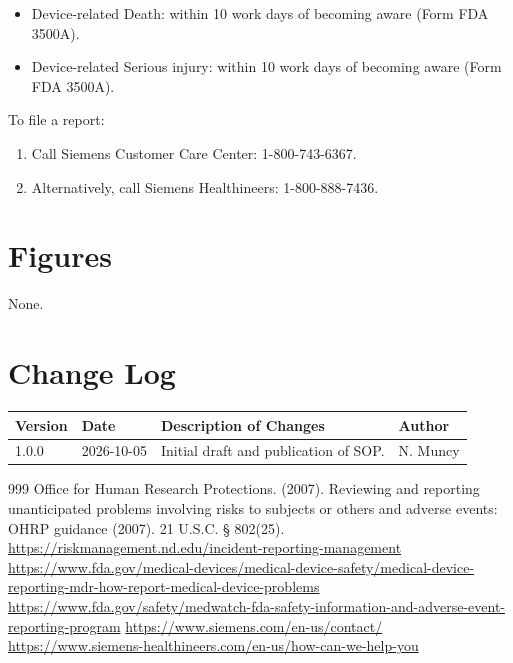 \documentclass[11pt]{article}
\begin{document}
\begin{itemize}
	\item Device-related Death: within 10 work days of becoming aware (Form FDA 3500A).
	\item Device-related Serious injury: within 10 work days of becoming aware (Form FDA 3500A).
\end{itemize}

To file a report:

\begin{enumerate}
	\item Call Siemens Customer Care Center: 1-800-743-6367\cite{siemens-care}.
	\item Alternatively, call Siemens Healthineers: 1-800-888-7436\cite{siemens-health}.
\end{enumerate}

\section{Figures}

None.


\pagebreak

\section{Change Log}
\noindent
\begin{tabularx}{\textwidth}{@{} l l X l @{}}
\toprule
\textbf{Version} & \textbf{Date} & \textbf{Description of Changes} & \textbf{Author} \\
\midrule
1.0.0 & 2026-10-05 & Initial draft and publication of SOP. & N. Muncy \\

\bottomrule
\end{tabularx}

\pagebreak

\begin{thebibliography}{999}
		Office for Human Research Protections. (2007).
		Reviewing and reporting unanticipated problems involving risks to subjects or others and adverse events: OHRP guidance (2007).
		21 U.S.C. § 802(25).
		\url{https://riskmanagement.nd.edu/incident-reporting-management}
		\url{https://www.fda.gov/medical-devices/medical-device-safety/medical-device-reporting-mdr-how-report-medical-device-problems}
		\url{https://www.fda.gov/safety/medwatch-fda-safety-information-and-adverse-event-reporting-program}
		\url{https://www.siemens.com/en-us/contact/}
		\url{https://www.siemens-healthineers.com/en-us/how-can-we-help-you}
\end{thebibliography}
\end{document}
